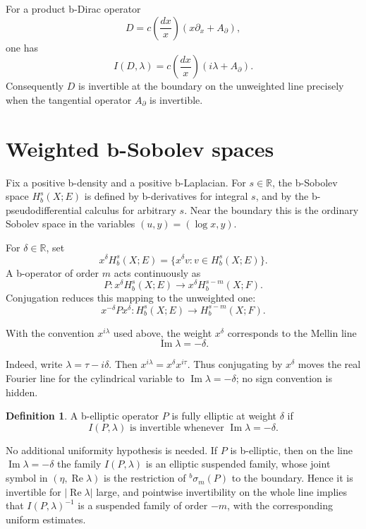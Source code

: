 \documentclass[12pt,oneside,reqno]{article}
\theoremstyle{plain}
\theoremstyle{definition}
\newtheorem{definition}[theorem]{Definition}
\theoremstyle{remark}
\begin{document}
For a product b-Dirac operator
\[
 D=c\!\left(\frac{dx}{x}\right)(x\partial_x+A_{\partial}),
\]
one has
\[
 I(D,\lambda)
 =
 c\!\left(\frac{dx}{x}\right)(i\lambda+A_{\partial}).
\]
Consequently \(D\) is invertible at the boundary on the unweighted line
precisely when the tangential operator \(A_{\partial}\) is invertible.

\section{Weighted b-Sobolev spaces}

Fix a positive b-density and a positive b-Laplacian. For
\(s\in\mathbb R\), the b-Sobolev space \(H_b^s(X;E)\) is defined by
b-derivatives for integral \(s\), and by the b-pseudodifferential calculus
for arbitrary \(s\). Near the boundary this is the ordinary Sobolev space
in the variables \((u,y)=(\log x,y)\).

For \(\delta\in\mathbb R\), set
\[
 x^\delta H_b^s(X;E)
 =
 \{x^\delta v:v\in H_b^s(X;E)\}.
\]
A b-operator of order \(m\) acts continuously as
\[
 P:x^\delta H_b^s(X;E)
 \longrightarrow
 x^\delta H_b^{s-m}(X;F).
\]
Conjugation reduces this mapping to the unweighted one:
\[
 x^{-\delta}Px^\delta:
 H_b^s(X;E)\longrightarrow H_b^{s-m}(X;F).
\]

With the convention \(x^{i\lambda}\) used above, the weight \(x^\delta\)
corresponds to the Mellin line
\[
 \operatorname{Im}\lambda=-\delta.
\]

Indeed, write \(\lambda=\tau-i\delta\). Then
\(x^{i\lambda}=x^{\delta}x^{i\tau}\). Thus conjugating by \(x^\delta\)
moves the real Fourier line for the cylindrical variable to
\(\operatorname{Im}\lambda=-\delta\); no sign convention is hidden.

\begin{definition}
A b-elliptic operator \(P\) is fully elliptic at weight \(\delta\) if
\[
 I(P,\lambda)\text{ is invertible whenever }
 \operatorname{Im}\lambda=-\delta.
\]
\end{definition}

No additional uniformity hypothesis is needed. If \(P\) is b-elliptic,
then on the line \(\operatorname{Im}\lambda=-\delta\) the family
\(I(P,\lambda)\) is an elliptic suspended family, whose joint symbol in
\((\eta,\operatorname{Re}\lambda)\) is the restriction of
\({}^b\sigma_m(P)\) to the boundary. Hence it is invertible for
\(|\operatorname{Re}\lambda|\) large, and pointwise invertibility on the
whole line implies that \(I(P,\lambda)^{-1}\) is a suspended family of
order \(-m\), with the corresponding uniform estimates.
\end{document}
